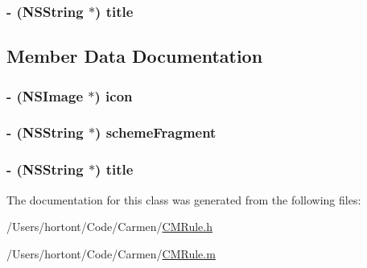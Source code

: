 \hypertarget{interface_c_m_rule_f628df2a3f47e8a1e61edfcc99e7d01f}{
\subsubsection[title]{\setlength{\rightskip}{0pt plus 5cm}- ({\bf NSString} $\ast$) {\bf title} }}
\label{interface_c_m_rule_f628df2a3f47e8a1e61edfcc99e7d01f}




\subsection{Member Data Documentation}
\hypertarget{interface_c_m_rule_ba7185a99d1799e91609c1e83d9201a0}{
\subsubsection[icon]{\setlength{\rightskip}{0pt plus 5cm}- (NSImage $\ast$) {\bf icon}}}
\label{interface_c_m_rule_ba7185a99d1799e91609c1e83d9201a0}


\hypertarget{interface_c_m_rule_483ee55143e0ed678e8b64f4d11c719e}{
\subsubsection[schemeFragment]{\setlength{\rightskip}{0pt plus 5cm}- ({\bf NSString} $\ast$) {\bf schemeFragment}}}
\label{interface_c_m_rule_483ee55143e0ed678e8b64f4d11c719e}


\hypertarget{interface_c_m_rule_5fd61a026220fa129d974771be6b4b4d}{
\subsubsection[title]{\setlength{\rightskip}{0pt plus 5cm}- ({\bf NSString} $\ast$) {\bf title}}}
\label{interface_c_m_rule_5fd61a026220fa129d974771be6b4b4d}




The documentation for this class was generated from the following files:\begin{CompactItemize}
\item 
/Users/hortont/Code/Carmen/\hyperlink{_c_m_rule_8h}{CMRule.h}\item 
/Users/hortont/Code/Carmen/\hyperlink{_c_m_rule_8m}{CMRule.m}\end{CompactItemize}
